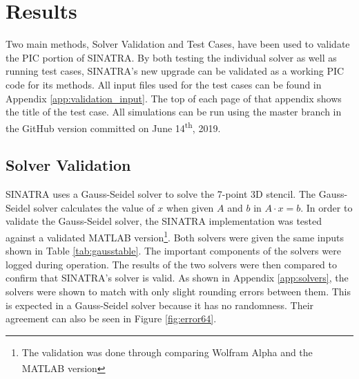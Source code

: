 \section{Results}

Two main methods, Solver Validation and Test Cases, have been used to validate the PIC portion of SINATRA. By both testing the individual solver as well as running test cases, SINATRA's new upgrade can be validated as a working PIC code for its methods. All input files used for the test cases can be found in Appendix \ref{app:validation_input}. The top of each page of that appendix shows the title of the test case. All simulations can be run using the master branch in the GitHub\textsuperscript{\textregistered} version committed on June 14\textsuperscript{th}, 2019.

\subsection{Solver Validation}

SINATRA uses a Gauss-Seidel solver to solve the 7-point 3D stencil. The Gauss-Seidel solver calculates the value of \(x\) when given \(A\) and \(b\) in \(A\cdot x = b\). In order to validate the Gauss-Seidel solver, the SINATRA implementation was tested against a validated MATLAB\textsuperscript{\textregistered} version\footnote{The validation was done through comparing Wolfram Alpha and the MATLAB\textsuperscript{\textregistered} version}. Both solvers were given the same inputs shown in Table \ref{tab:gausstable}. The important components of the solvers were logged during operation. The results of the two solvers were then compared to confirm that SINATRA's solver is valid. As shown in Appendix \ref{app:solvers}, the solvers were shown to match with only slight rounding errors between them. This is expected in a Gauss-Seidel solver because it has no randomness. Their agreement can also be seen in Figure \ref{fig:error64}. \par

